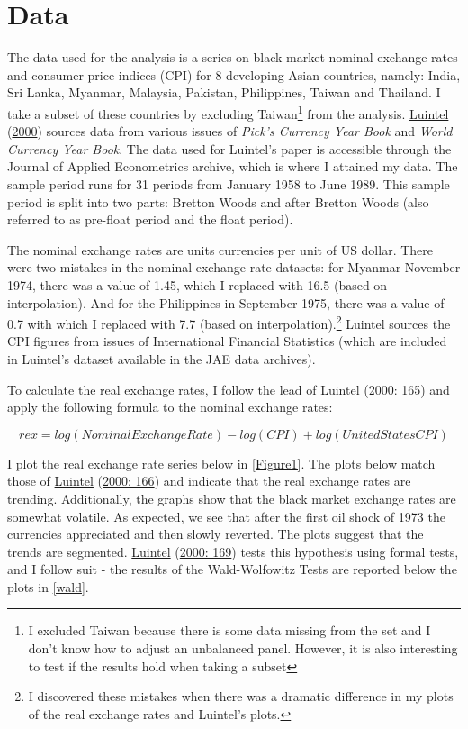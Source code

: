 \documentclass[11pt,preprint, authoryear]{elsarticle}
\numberwithin{equation}{section}
\numberwithin{figure}{section}
\numberwithin{table}{section}
\let\rmarkdownfootnote\footnote%
\def\footnote{\protect\rmarkdownfootnote}
\begin{document}
\hypertarget{data}{%
\section{\texorpdfstring{Data \label{Data}}{Data }}\label{data}}

The data used for the analysis is a series on black market nominal
exchange rates and consumer price indices (CPI) for 8 developing Asian
countries, namely: India, Sri Lanka, Myanmar, Malaysia, Pakistan,
Philippines, Taiwan and Thailand. I take a subset of these countries by
excluding Taiwan\footnote{I excluded Taiwan because there is some data
  missing from the set and I don't know how to adjust an unbalanced
  panel. However, it is also interesting to test if the results hold
  when taking a subset} from the analysis.
\protect\hyperlink{ref-Kul}{Luintel} (\protect\hyperlink{ref-Kul}{2000})
sources data from various issues of \emph{Pick's Currency Year Book} and
\emph{World Currency Year Book}. The data used for Luintel's paper is
accessible through the Journal of Applied Econometrics archive, which is
where I attained my data. The sample period runs for 31 periods from
January 1958 to June 1989. This sample period is split into two parts:
Bretton Woods and after Bretton Woods (also referred to as pre-float
period and the float period).

The nominal exchange rates are units currencies per unit of US dollar.
There were two mistakes in the nominal exchange rate datasets: for
Myanmar November 1974, there was a value of 1.45, which I replaced with
16.5 (based on interpolation). And for the Philippines in September
1975, there was a value of 0.7 with which I replaced with 7.7 (based on
interpolation).\footnote{I discovered these mistakes when there was a
  dramatic difference in my plots of the real exchange rates and
  Luintel's plots.} Luintel sources the CPI figures from issues of
International Financial Statistics (which are included in Luintel's
dataset available in the JAE data archives).

To calculate the real exchange rates, I follow the lead of
\protect\hyperlink{ref-Kul}{Luintel} (\protect\hyperlink{ref-Kul}{2000:
165}) and apply the following formula to the nominal exchange rates:

\[
rex = log(Nominal Exchange Rate) - log(CPI) + log(United States CPI)
\]

I plot the real exchange rate series below in \ref{Figure1}. The plots
below match those of \protect\hyperlink{ref-Kul}{Luintel}
(\protect\hyperlink{ref-Kul}{2000: 166}) and indicate that the real
exchange rates are trending. Additionally, the graphs show that the
black market exchange rates are somewhat volatile. As expected, we see
that after the first oil shock of 1973 the currencies appreciated and
then slowly reverted. The plots suggest that the trends are segmented.
\protect\hyperlink{ref-Kul}{Luintel} (\protect\hyperlink{ref-Kul}{2000:
169}) tests this hypothesis using formal tests, and I follow suit - the
results of the Wald-Wolfowitz Tests are reported below the plots in
\ref{wald}.
\end{document}
